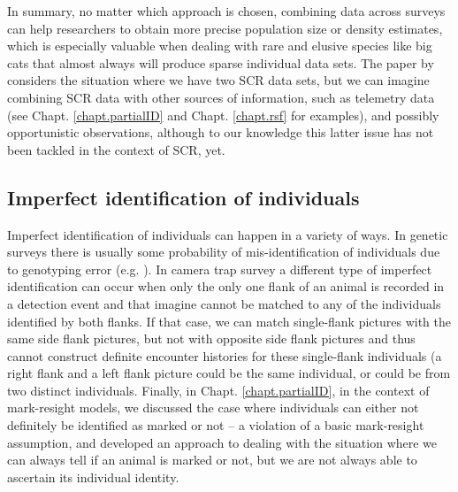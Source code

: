 In summary, no matter which approach is chosen, combining data across
surveys can help researchers to obtain more precise population size or
density
estimates, which is especially valuable when dealing with rare and
elusive species like big cats that almost always will produce sparse
individual data sets. 
The paper by \citet{gopalaswamy_etal:2012mee} considers the
situation where we have two SCR data sets, but we can imagine
combining SCR data with other sources of information, such as
telemetry data (see Chapt. \ref{chapt.partialID} and
Chapt. \ref{chapt.rsf} for examples), and possibly opportunistic
observations, although to our knowledge this latter issue has not been
tackled in the context of SCR, yet.


\subsection{Imperfect identification of individuals}

Imperfect identification of individuals can happen in a variety of
ways. In genetic surveys there is usually some probability of
mis-identification of individuals due to genotyping error
(e.g. \citet{lukacs_burnham:2005}). In camera trap survey a different
type of imperfect identification can occur when only the only one
flank of an animal is recorded in a detection event and that imagine
cannot be matched to any of the individuals identified by both
flanks. If that case, we can match single-flank pictures with the same
side flank pictures, but not with opposite side flank pictures and
thus cannot construct definite encounter histories for these
single-flank individuals (a right flank and a left flank picture could
be the same individual, or could be from two distinct
individuals. Finally, in Chapt. \ref{chapt.partialID}, in the context
of mark-resight models, we discussed the case where individuals can
either not definitely be identified as marked or not -- a violation of
a basic mark-resight assumption, and developed an approach to dealing
with the situation where we can always tell if an animal is marked or
not, but we are not always able to ascertain its individual identity.

